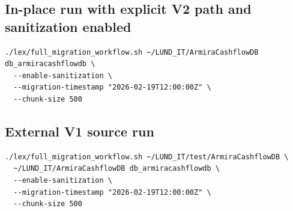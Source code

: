 \documentclass[11pt,a4paper]{article}
\begin{document}
\subsection*{In-place run with explicit V2 path and sanitization enabled}
\begin{verbatim}
./lex/full_migration_workflow.sh ~/LUND_IT/ArmiraCashflowDB db_armiracashflowdb \
  --enable-sanitization \
  --migration-timestamp "2026-02-19T12:00:00Z" \
  --chunk-size 500
\end{verbatim}

\subsection*{External V1 source run}
\begin{verbatim}
./lex/full_migration_workflow.sh ~/LUND_IT/test/ArmiraCashflowDB \
  ~/LUND_IT/ArmiraCashflowDB db_armiracashflowdb \
  --enable-sanitization \
  --migration-timestamp "2026-02-19T12:00:00Z" \
  --chunk-size 500
\end{verbatim}
\end{document}
